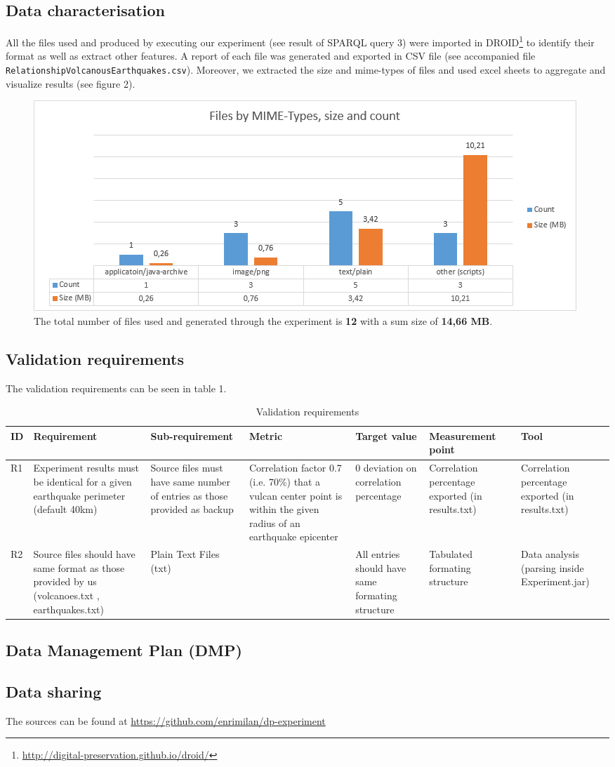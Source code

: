 \documentclass[12pt, a4paper]{article}
\begin{document}
\subsection{Data characterisation}
All the files used and produced by executing our experiment (see result of SPARQL query 3) were imported in DROID\footnote{\url{http://digital-preservation.github.io/droid/}} to identify their format as well as extract other features. A report of each file was generated and exported in CSV file (see accompanied file \verb|RelationshipVolcanousEarthquakes.csv|). Moreover, we extracted the size and mime-types of files and used excel sheets to aggregate and visualize results (see figure 2).
\begin{figure}[h]
  \centering
    \includegraphics[scale=0.85]{graph}
    \caption{The total number of files used and generated through the experiment is {\bf 12} with a sum size of {\bf 14,66 MB}.}
\end{figure}

\subsection{Validation requirements}
The validation requirements can be seen in table 1.
\begin{table}[h]
\centering
\begin{tabular}{|p{0.5cm}|p{3.0cm}|p{3.5cm}|p{3.0cm}|p{1.5cm}|p{3.0cm}|p{2.0cm}|}
\hline
 \textbf{ID} & \textbf{Requirement} & \textbf{Sub-requirement} & \textbf{Metric} & \textbf{Target value} & \textbf{Measurement point} & \textbf{Tool} \\ \hline
 R1 & Experiment results must be identical for a given earthquake perimeter (default 40km) & Source files must have same number of entries as those provided as backup & 
Correlation factor 0.7 (i.e. 70\%) that a vulcan center point is within the given radius of an earthquake epicenter
 & 0 deviation on correlation percentage & Correlation percentage exported (in results.txt) & Correlation percentage exported (in results.txt) \\ \hline
 R2 &  Source files should have same format as those provided by us (volcanoes.txt , earthquakes.txt) & Plain Text Files (txt) & &
All entries should have same formating structure & Tabulated formating structure & Data analysis (parsing inside Experiment.jar)      \\ \hline
\end{tabular}
\caption{Validation requirements}
\end{table}

\subsection{Data Management Plan (DMP)}

\subsection{Data sharing}
The sources can be found at \url{https://github.com/enrimilan/dp-experiment}
\end{document}
